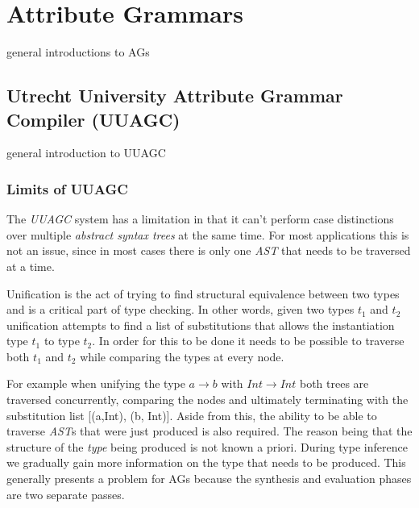 \chapter{Attribute Grammars}
general introductions to AGs
\section{Utrecht University Attribute Grammar Compiler (UUAGC)}
 general introduction to UUAGC
\subsection{Limits of UUAGC}
The \emph{UUAGC} system has a limitation in that it can't perform case distinctions over multiple \emph{abstract syntax trees} at the same time\cite{visitag}. For most applications this is not an issue, since in most cases there is only one \emph{AST} that needs to be traversed at a time. 

Unification is the act of trying to find structural equivalence between two types and is a critical part of type checking. In other words, given two types \emph{$t_{1}$} and \emph{$t_{2}$} unification attempts to find a list of substitutions that allows the instantiation type \emph{$t_{1}$} to type \emph{$t_{2}$}. In order for this to be done it needs to be possible to traverse both \emph{$t_{1}$} and \emph{$t_{2}$} while comparing the types at every node.

%
%    
%

For example when unifying the type \emph{$a \rightarrow b$} with \emph{$Int \rightarrow Int$} both trees are traversed concurrently, comparing the nodes and ultimately terminating with the substitution list [(a,Int), (b, Int)]. Aside from this, the ability to be able to traverse \emph{AST}s that were just produced is also required. The reason being that the structure of the \emph{type} being produced is not known a priori. During type inference we gradually gain more information on the type that needs to be produced. This generally presents a problem for AGs\cite{ruler-front} because the synthesis and evaluation phases are two separate passes.

